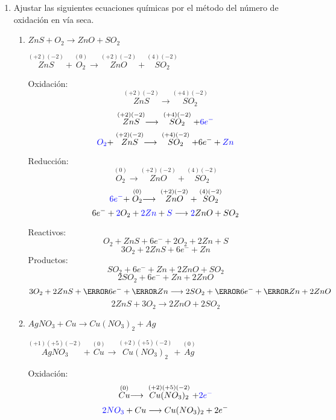 \documentclass[../Práctica.root.tex]{subfiles}
\newcommand{\lra}{\ensuremath{\longrightarrow{}}}
\newcommand{\sr}[2]{\stackrel{#1}{#2}}
\begin{document}
\begin{enumerate}
\begin{enumerate}
          \end{enumerate}

    \item Ajustar las siguientes ecuaciones químicas por el método del número de oxidación en vía
          seca.
          \begin{enumerate}
              \item $ZnS + O_2 \lra ZnO + SO_2$

                    $\sr{(+2)(-2)}{ZnS} + \sr{(0)}{O_2} \lra \sr{(+2)(-2)}{ZnO} + \sr{(4)(-2)}{SO_2}$

                    \begin{multicols}{2}
                        Oxidación:
                        \[ \sr{(+2)(-2)}{ZnS} \lra \sr{(+4)(-2)}{SO_2} \]
                        \[ \sr{(+2)(-2)}{ZnS} \lra \sr{(+4)(-2)}{SO_2} + \blue{6e^-} \]
                        \[ \blue{O_2} + \sr{(+2)(-2)}{ZnS} \lra \sr{(+4)(-2)}{SO_2} + 6 e^- + \blue{Zn} \]

                        \columnbreak

                        Reducción:
                        \[ \sr{(0)}{O_2} \lra \sr{(+2)(-2)}{ZnO} + \sr{(4)(-2)}{SO_2} \]
                        \[ \blue{6e^-} + \sr{(0)}{O_2} \lra \sr{(+2)(-2)}{ZnO} + \sr{(4)(-2)}{SO_2} \]
                        \[ 6 e^- + \blue{2} O_2 + \blue{2Zn} + \blue{S} \lra \blue{2} ZnO + SO_2 \]
                    \end{multicols}


                    Reactivos:
                    \[ O_2 + ZnS + 6 e^- + 2 O_2 + 2Zn + S \]
                    \[ 3 O_2 + 2 ZnS + 6 e^- + Zn \]
                    Productos:
                    \[ SO_2 + 6 e^- + Zn + 2 ZnO + SO_2 \]
                    \[ 2 SO_2 + 6 e^- + Zn + 2 ZnO \]
                    \[ 3 O_2 + 2 ZnS + \cancel{6 e^-} + \cancel{Zn} \lra 2 SO_2 + \cancel{6 e^-} + \cancel{Zn} + 2 ZnO \]
                    \[ 2 ZnS + 3 O_2 \lra 2 ZnO + 2 SO_2 \]

              \item $AgNO_3 + Cu \lra Cu(NO_3)_2 + Ag$

                    $\sr{(+1)(+5)(-2)}{AgNO_3} + \sr{(0)}{Cu} \lra \sr{(+2)(+5)(-2)}{Cu(NO_3)_2} + \sr{(0)}{Ag}$

                    \begin{multicols}{2}
                        Oxidación:
                        \[ \sr{(0)}{Cu} \lra \sr{(+2)(+5)(-2)}{Cu(NO_3)_2} + \blue{2e^-} \]
                        \[ \blue{2NO_3} + Cu \lra Cu(NO_3)_2 + 2 e^- \]


\end{multicols}
\end{enumerate}
\end{enumerate}
\end{document}
